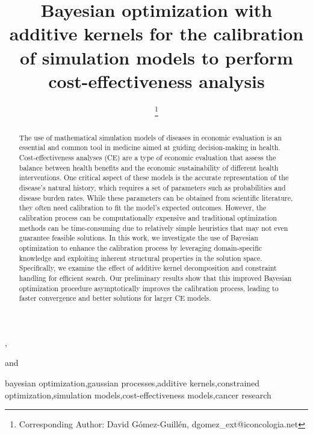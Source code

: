 \documentclass{IOS-Book-Article}
\def\hb{\hbox to 11.5 cm{}}
\begin{document}
	
	\pagestyle{headings}
	\def\thepage{}
	\begin{frontmatter}              %
		
		
		\title{Bayesian optimization with additive kernels for the calibration of simulation models to perform cost-effectiveness analysis}
		
		\markboth{}{April 2023\hb}
		
		\author[A,B]{ %
			\thanks{Corresponding Author: David Gómez-Guillén, dgomez\_ext@iconcologia.net}},
		\author[B,C]{ }
		\author[D]{ }
		and
		\author[D]{ }
		
		\address[A]{Universitat Autònoma de Barcelona (UAB)}
		\address[B]{Institut Català d'Oncologia (ICO) - Institut d'Investigació Biomèdica de Bellvitge (IDIBELL)}
		\address[C]{Consortium for Biomedical Research in Epidemiology and Public Health - CIBERESP. Carlos III Institute of Health}
		\address[D]{Institut d'Investigació en Intel·ligència Artificial - Consell Superior d'Investigacions Científiques (IIIA-CSIC)}
		
		\begin{abstract}
			The use of mathematical simulation models of diseases in economic evaluation is an essential and common tool in medicine aimed at guiding decision-making in health. Cost-effectiveness analyses (CE) are a type of economic evaluation that assess the balance between health benefits and the economic sustainability of different health interventions. One critical aspect of these models is the accurate representation of the disease's natural history, which requires a set of parameters such as probabilities and disease burden rates. While these parameters can be obtained from scientific literature, they often need calibration to fit the model's expected outcomes. However, the calibration process can be computationally expensive and traditional optimization methods can be time-consuming due to relatively simple heuristics that may not even guarantee feasible solutions.
			In this work, we investigate the use of Bayesian optimization to enhance the calibration process by leveraging domain-specific knowledge and exploiting inherent structural properties in the solution space. Specifically, we examine the effect of additive kernel decomposition and constraint handling for efficient search.
			Our preliminary results show that this improved Bayesian optimization procedure asymptotically improves the calibration process, leading to faster convergence and better solutions for larger CE models.
		\end{abstract}
		
		\begin{keyword}
			bayesian optimization\sep gaussian processes\sep additive kernels\sep constrained optimization\sep simulation models\sep cost-effectiveness models\sep  cancer research
		\end{keyword}
	\end{frontmatter}
\end{document}

